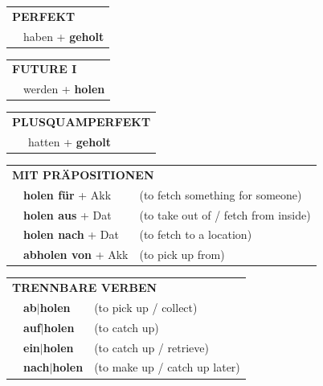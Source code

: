 \documentclass[10pt,a4paper]{revtex4-2}
\begin{document}
\begin{verbbox-acc}
    \vspace{10pt}

 \begin{tabular}{rl}
     \multicolumn{2}{l}{\textbf{PERFEKT}}\\
   & haben + \textbf{geholt}\\
  \end{tabular}
\hfill
   \begin{tabular}{rl}
   
    \multicolumn{2}{l}{\textbf{FUTURE I} }\\
   & werden + \textbf{holen}\\
 
  \end{tabular}
\hfill
   \begin{tabular}{rl}
      \multicolumn{2}{l}{\textbf{PLUSQUAMPERFEKT}}\\
   & hatten + \textbf{geholt}\\
  \end{tabular}
  
  \vspace{10pt}

   \begin{tabular}{lll}
      \multicolumn{3}{l}{\textbf{MIT PRÄPOSITIONEN}}\\
& \textbf{holen für} + Akk & (to fetch something for someone)\\
& \textbf{holen aus} + Dat & (to take out of / fetch from inside)\\
&\textbf{holen nach} + Dat & (to fetch to a location)\\
&\textbf{abholen von} + Akk & (to pick up from)
  \end{tabular}
  \hfill
   \begin{tabular}{lll}
      \multicolumn{3}{l}{\textbf{TRENNBARE VERBEN}}\\
 & \textbf{ab$|$holen} & (to pick up / collect)\\
 & \textbf{auf$|$holen} & (to catch up)\\
     & \textbf{ein$|$holen} & (to catch up / retrieve)\\
     & \textbf{nach$|$holen} & (to make up / catch up later)
  \end{tabular}


  \vspace{-5pt}

\end{verbbox-acc}
\end{document}
